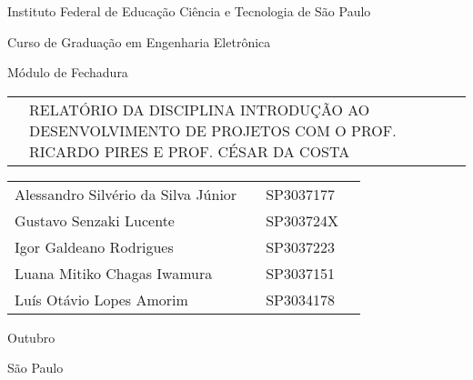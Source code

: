 \begin{center}
   	\vspace{2.5cm}
   	
   	Instituto Federal de Educação Ciência e Tecnologia de São Paulo
   	
   	Curso de Graduação em Engenharia Eletrônica
   	\vspace{3cm}
   	
   	Módulo de Fechadura
   	
   	\vspace{2.5cm}
   	\begin{tabular}{p{10cm}p{6cm}}
   		& RELATÓRIO DA DISCIPLINA INTRODUÇÃO AO
   		DESENVOLVIMENTO DE PROJETOS COM O PROF.
   		RICARDO PIRES E PROF. CÉSAR DA COSTA	
   	\end{tabular}

    
    \vspace{4cm}
    \begin{tabular}{p{6cm}p{2cm}p{2cm}p{3cm}}
		Alessandro Silvério da Silva Júnior & & SP3037177 \\
		Gustavo Senzaki Lucente & & SP303724X \\
		Igor Galdeano Rodrigues & & SP3037223 \\
		Luana Mitiko Chagas Iwamura & & SP3037151 \\
    	Luís Otávio Lopes Amorim & & SP3034178
    \end{tabular}
    
    \vspace*{\fill}
    Outubro
    
    São Paulo
   	\pagebreak
\end{center}